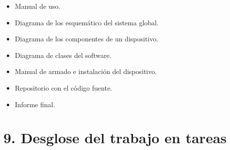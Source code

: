 \documentclass[
11pt, %
codirector, %
]{charter}
\begin{document}
\begin{itemize}
	\item Manual de uso.
	\item Diagrama de los esquemático del sistema global.
	\item Diagrama de los componentes de un dispositivo.
	\item Diagrama de clases del software.
	\item Manual de armado e instalación del dispositivo.
	\item Repositorio con el código fuente.
	\item Informe final.
\end{itemize}

\section{9. Desglose del trabajo en tareas}
\label{sec:wbs}
\end{document}
